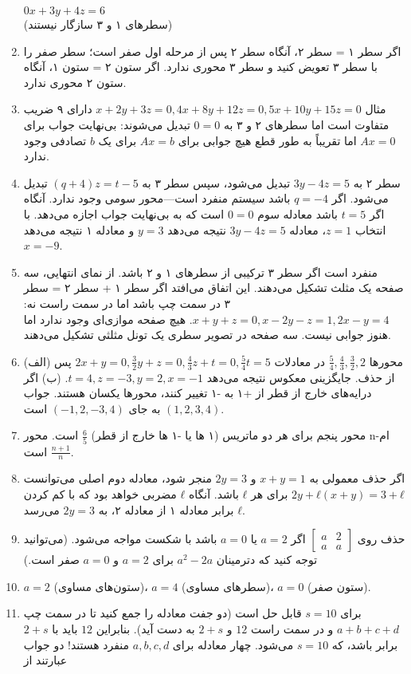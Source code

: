 \documentclass[12pt]{article}
\begin{document}
\begin{enumerate}
		$0x +3y +4z =6$ \\
		(سطرهای ۱ و ۳ سازگار نیستند)
		\item اگر سطر ۱ = سطر ۲، آنگاه سطر ۲ پس از مرحله اول صفر است؛ سطر صفر را با سطر ۳ تعویض کنید و سطر ۳ محوری ندارد. اگر ستون ۲ = ستون ۱، آنگاه ستون ۲ محوری ندارد.
		\item مثال $x +2y +3z = 0, 4x+8y+12z = 0, 5x+10y+15z = 0$ دارای ۹ ضریب متفاوت است اما سطرهای ۲ و ۳ به $0=0$ تبدیل می‌شوند: بی‌نهایت جواب برای $Ax=0$ اما تقریباً به طور قطع هیچ جوابی برای $Ax=b$ برای یک $b$ تصادفی وجود ندارد.
		\item سطر ۲ به $3y−4z=5$ تبدیل می‌شود، سپس سطر ۳ به $(q+4)z = t−5$ تبدیل می‌شود. اگر $q=−4$ باشد سیستم منفرد است—محور سومی وجود ندارد. آنگاه اگر $t=5$ باشد معادله سوم $0=0$ است که به بی‌نهایت جواب اجازه می‌دهد. با انتخاب $z=1$، معادله $3y−4z=5$ نتیجه می‌دهد $y=3$ و معادله ۱ نتیجه می‌دهد $x=−9$.
		\item منفرد است اگر سطر ۳ ترکیبی از سطرهای ۱ و ۲ باشد. از نمای انتهایی، سه صفحه یک مثلث تشکیل می‌دهند. این اتفاق می‌افتد اگر سطر ۱ + سطر ۲ = سطر ۳ در سمت چپ باشد اما در سمت راست نه: $x+y+z=0, x−2y−z=1, 2x−y=4$. هیچ صفحه موازی‌ای وجود ندارد اما هنوز جوابی نیست. سه صفحه در تصویر سطری یک تونل مثلثی تشکیل می‌دهند.
		\item (الف) محورها $\frac{5}{4}, \frac{4}{3}, \frac{3}{2}, 2$ در معادلات $2x + y = 0, \frac{3}{2}y +z = 0, \frac{4}{3}z +t = 0, \frac{5}{4}t = 5$ پس از حذف. جایگزینی معکوس نتیجه می‌دهد $t = 4,z = −3,y = 2,x = −1$. (ب) اگر درایه‌های خارج از قطر از +۱ به -۱ تغییر کنند، محورها یکسان هستند. جواب $(1, 2,3,4)$ به جای $(−1,2,−3,4)$ است.
		\item محور پنجم برای هر دو ماتریس (۱ ها یا -۱ ها خارج از قطر) $\frac{6}{5}$ است. محور n-ام $\frac{n+1}{n}$ است.
		\item اگر حذف معمولی به $x+y=1$ و $2y=3$ منجر شود، معادله دوم اصلی می‌توانست $2y+ℓ(x+y)=3+ℓ$ برای هر $ℓ$ باشد. آنگاه $ℓ$ مضربی خواهد بود که با کم کردن $ℓ$ برابر معادله ۱ از معادله ۲، به $2y=3$ می‌رسد.
		\item حذف روی $\begin{bmatrix} a & 2 \\ a & a \end{bmatrix}$ اگر $a=2$ یا $a=0$ باشد با شکست مواجه می‌شود. (می‌توانید توجه کنید که دترمینان $a^2−2a$ برای $a=2$ و $a=0$ صفر است.)
		\item $a=2$ (ستون‌های مساوی)، $a=4$ (سطرهای مساوی)، $a=0$ (ستون صفر).
		\item برای $s=10$ قابل حل است (دو جفت معادله را جمع کنید تا در سمت چپ $a+b+c+d$ و در سمت راست $12$ و $2+s$ به دست آید). بنابراین $12$ باید با $2+s$ برابر باشد، که $s=10$ می‌شود. چهار معادله برای $a,b,c,d$ منفرد هستند! دو جواب عبارتند از

\end{enumerate}
\end{document}
